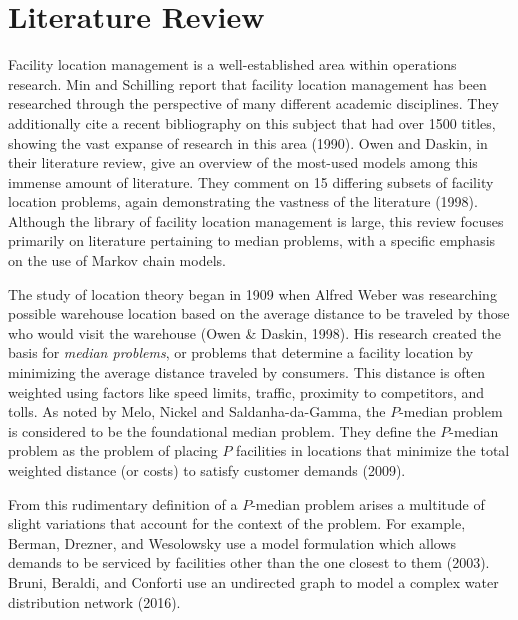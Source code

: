 \documentclass[twoside,twocolumn]{article}
\begin{document}
\section{Literature Review}

Facility location management is a well-established area within operations research.
Min and Schilling report that facility location management has been researched through the perspective of many different academic disciplines. %
They additionally cite a recent bibliography on this subject that had over 1500 titles, showing the vast expanse of research in this area (1990).
Owen and Daskin, in their literature review, give an overview of the most-used models among this immense amount of literature.
They comment on 15 differing subsets of facility location problems, again demonstrating the vastness of the literature (1998).
Although the library of facility location management is large, this review focuses primarily on literature pertaining to median problems, with a specific emphasis on the use of Markov chain models.

The study of location theory began in 1909 when Alfred Weber was researching possible warehouse location based on the average distance to be traveled by those who would visit the warehouse (Owen \& Daskin, 1998).
His research created the basis for {\em median problems}, or problems that determine a facility location by minimizing the average distance traveled by consumers.
This distance is often weighted using factors like speed limits, traffic, proximity to competitors, and tolls.
As noted by Melo, Nickel and Saldanha-da-Gamma, the $P$-median problem is considered to be the foundational median problem.
They define the $P$-median problem as the problem of placing $P$ facilities in locations that minimize the total weighted distance (or costs) to satisfy customer demands (2009).

From this rudimentary definition of a $P$-median problem arises a multitude of slight variations that account for the context of the problem.
For example, Berman, Drezner, and Wesolowsky use a model formulation which allows demands to be serviced by facilities other than the one closest to them (2003).
Bruni, Beraldi, and Conforti use an undirected graph to model a complex water distribution network (2016).


\end{document}
